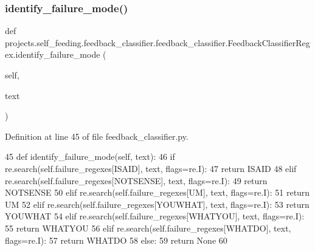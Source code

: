 \subsubsection{\texorpdfstring{identify\+\_\+failure\+\_\+mode()}{identify\_failure\_mode()}}
{\footnotesize\ttfamily def projects.\+self\+\_\+feeding.\+feedback\+\_\+classifier.\+feedback\+\_\+classifier.\+Feedback\+Classifier\+Regex.\+identify\+\_\+failure\+\_\+mode (\begin{DoxyParamCaption}\item[{}]{self,  }\item[{}]{text }\end{DoxyParamCaption})}



Definition at line 45 of file feedback\+\_\+classifier.\+py.


\begin{DoxyCode}
45     \textcolor{keyword}{def }identify\_failure\_mode(self, text):
46         \textcolor{keywordflow}{if} re.search(self.failure\_regexes[ISAID], text, flags=re.I):
47             \textcolor{keywordflow}{return} ISAID
48         \textcolor{keywordflow}{elif} re.search(self.failure\_regexes[NOTSENSE], text, flags=re.I):
49             \textcolor{keywordflow}{return} NOTSENSE
50         \textcolor{keywordflow}{elif} re.search(self.failure\_regexes[UM], text, flags=re.I):
51             \textcolor{keywordflow}{return} UM
52         \textcolor{keywordflow}{elif} re.search(self.failure\_regexes[YOUWHAT], text, flags=re.I):
53             \textcolor{keywordflow}{return} YOUWHAT
54         \textcolor{keywordflow}{elif} re.search(self.failure\_regexes[WHATYOU], text, flags=re.I):
55             \textcolor{keywordflow}{return} WHATYOU
56         \textcolor{keywordflow}{elif} re.search(self.failure\_regexes[WHATDO], text, flags=re.I):
57             \textcolor{keywordflow}{return} WHATDO
58         \textcolor{keywordflow}{else}:
59             \textcolor{keywordflow}{return} \textcolor{keywordtype}{None}
60 \end{DoxyCode}
\mbox{\label{classprojects_1_1self__feeding_1_1feedback__classifier_1_1feedback__classifier_1_1FeedbackClassifierRegex_a31bd7f9578428ad2cf1921c4fbf51ba8}} 
